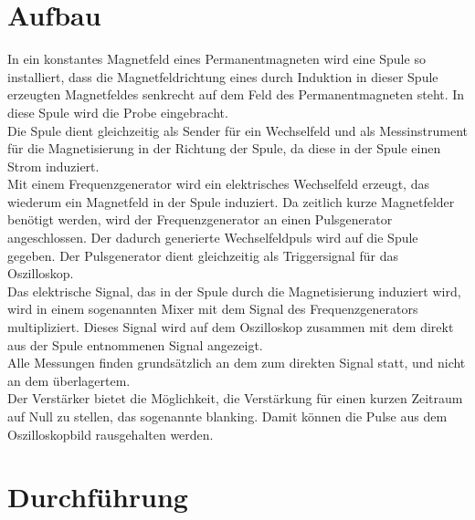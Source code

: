 \documentclass[12pt,a4paper]{article}
\begin{document}
\section{Aufbau}
In ein konstantes Magnetfeld eines Permanentmagneten wird eine Spule so installiert, dass die Magnetfeldrichtung eines durch Induktion in dieser Spule erzeugten Magnetfeldes senkrecht auf dem Feld des Permanentmagneten steht. In diese Spule wird die Probe eingebracht. \\
Die Spule dient gleichzeitig als Sender für ein Wechselfeld und als Messinstrument für die Magnetisierung in der Richtung der Spule, da diese in der Spule einen Strom induziert.\\
Mit einem Frequenzgenerator wird ein elektrisches Wechselfeld erzeugt, das wiederum ein Magnetfeld in der Spule induziert. Da zeitlich kurze Magnetfelder benötigt werden, wird der Frequenzgenerator an einen Pulsgenerator angeschlossen. Der dadurch generierte Wechselfeldpuls wird auf die Spule gegeben. Der Pulsgenerator dient gleichzeitig als Triggersignal für das Oszilloskop.\\
Das elektrische Signal, das in der Spule durch die Magnetisierung induziert wird, wird in einem sogenannten Mixer mit dem Signal des Frequenzgenerators multipliziert. Dieses Signal wird auf dem Oszilloskop zusammen mit dem direkt aus der Spule entnommenen Signal angezeigt.\\
Alle Messungen finden grundsätzlich an dem zum direkten Signal statt, und nicht an dem überlagertem.\\
Der Verstärker bietet die Möglichkeit, die Verstärkung für einen kurzen Zeitraum auf Null zu stellen, das sogenannte blanking. Damit können die Pulse aus dem Oszilloskopbild rausgehalten werden.\\




\section{Durchführung}
\end{document}
